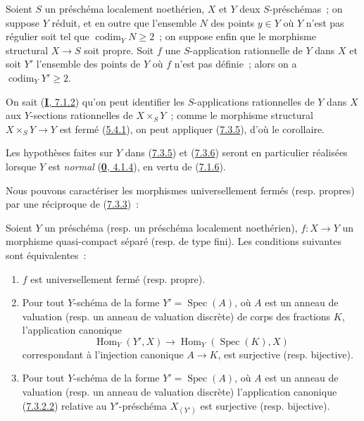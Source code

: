 \begin{corollary}[7.3.6]
\label{II.7.3.6-fr}
Soient $S$ un préschéma localement noethérien, $X$ et $Y$ deux
$S$-préschémas~; on suppose $Y$ réduit, et en outre que l'ensemble $N$ des
points $y\in Y$ où $Y$ n'est pas régulier soit tel que
$\operatorname{codim}_YN\geq2$~; on suppose enfin que le morphisme structural
$X\to S$ soit propre. Soit $f$ une $S$-application rationnelle de $Y$ dans
$X$ et soit $Y'$ l'ensemble des points de $Y$ où $f$ n'est pas définie~;
alors on a $\operatorname{codim}_YY'\geq2$.
\end{corollary}

On sait (\hyperref[I.7.1.2-fr]{\textbf{I}, 7.1.2}) qu'on peut identifier les
$S$-applications rationnelles de $Y$ dans $X$ aux $Y$-sections rationnelles
de $X\times_SY$~; comme le morphisme structural $X\times_SY\to Y$ est fermé
(\hyperref[II.5.4.1-fr]{5.4.1}), on peut appliquer
(\hyperref[II.7.3.5-fr]{7.3.5}), d'où le corollaire.

\begin{remark}[7.3.7]
\label{II.7.3.7-fr}
Les hypothèses faites sur $Y$ dans (\hyperref[II.7.3.5-fr]{7.3.5}) et
(\hyperref[II.7.3.6-fr]{7.3.6}) seront en particulier réalisées lorsque $Y$
est \emph{normal} (\hyperref[0.4.1.4-fr]{\textbf{0}, 4.1.4}), en vertu de
(\hyperref[II.7.1.6-fr]{7.1.6}).
\end{remark}

Nous pouvons caractériser les morphismes universellement fermés (resp.
propres) par une réciproque de (\hyperref[II.7.3.3-fr]{7.3.3})~:

\begin{theorem}[7.3.8]
\label{II.7.3.8-fr}
Soient $Y$ un préschéma \textup{(resp.} un préschéma localement noethérien\textup{)}, $f:X\to Y$
un morphisme quasi-compact séparé \textup{(resp.} de type fini\textup{)}. Les conditions
suivantes sont équivalentes~:
\begin{enumerate}
\item[\rm a)] $f$ est universellement fermé \textup{(resp.} propre\textup{)}.
\item[\rm b)] Pour tout $Y$-schéma de la forme
$Y'=\operatorname{Spec}(A)$, où $A$ est un anneau de valuation \textup{(resp.} un anneau
de valuation discrète) de corps des fractions $K$, l'application canonique
\[
\operatorname{Hom}_Y(Y',X)\longrightarrow
\operatorname{Hom}_Y(\operatorname{Spec}(K),X)
\]
correspondant à l'injection canonique $A\to K$, est surjective \textup{(resp.}
bijective\textup{)}.
\item[\rm c)] Pour tout $Y$-schéma de la forme $Y'=\operatorname{Spec}(A)$,
où $A$ est un anneau de valuation \textup{(resp.} un anneau de valuation discrète)
l'application canonique \textup{(\hyperref[II.7.3.2.2-fr]{7.3.2.2})} relative au
$Y'$-préschéma $X_{(Y')}$ est surjective \textup{(resp.} bijective).
\end{enumerate}
\end{theorem}

